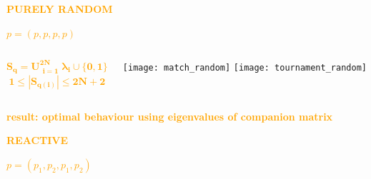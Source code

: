 \documentclass{beamer}
\begin{document}
\begin{frame}
    \begin{center}
    
    \end{center}
\end{frame}

\begin{frame}
    \begin{center}
    
    \end{center}
\end{frame}

\begin{frame}
    \begin{center}
    \Large{
    \textbf{\textcolor{orange}{PURELY RANDOM}} \vspace{1cm}

    \textcolor{orange}{\boldmath\( p = (p, p, p, p)\)}}
    \end{center}
\end{frame}

\begin{frame}
    \begin{columns}
        \begin{column}{.5\textwidth}
    \Large{\textcolor{orange}{
    \[\mathbf{S_q = U_{\substack{i=1}} ^ {2N} \lambda_i \cup \{0, 1\}}\] \vspace{1mm}
    \[\mathbf{1 \leq|S_{q(i)}| \leq 2N + 2}\]}}
        \end{column}
        \begin{column}{.5\textwidth}
            \texttt{[image: match\_random]}
            \texttt{[image: tournament\_random]}
        \end{column}
    \end{columns}
    \pause
    \centering
    \vspace{1cm}
    \textbf{\textcolor{orange}{result: optimal behaviour using eigenvalues of companion matrix}}
\end{frame}

\begin{frame}
    \begin{center}
    \Large{
    \textbf{\textcolor{orange}{REACTIVE}} \vspace{1cm}

    \textcolor{orange}{\boldmath\( p = (p_1, p_2, p_1, p_2)\)}}
    \end{center}
\end{frame}
\end{document}
